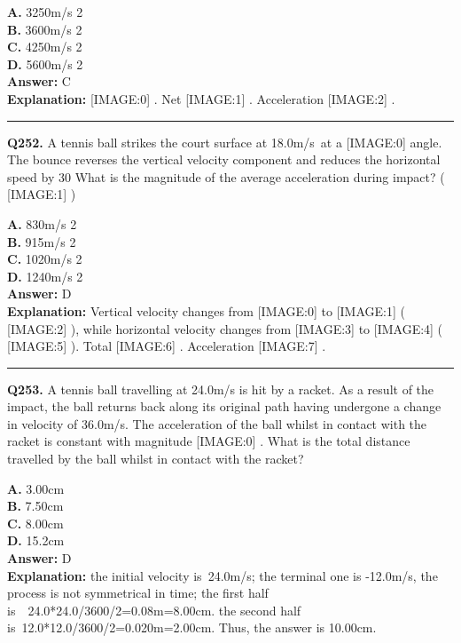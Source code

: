 \documentclass[12pt]{article}
\begin{document}
\textbf{A.} 3250m/s
2 \\
\textbf{B.} 3600m/s
2 \\
\textbf{C.} 4250m/s
2 \\
\textbf{D.} 5600m/s
2 \\

\textbf{Answer:} C \\
\textbf{Explanation:} [IMAGE:0]
. Net
[IMAGE:1]
. Acceleration
[IMAGE:2]
.

\hrule
\vspace{1em}


\noindent
\textbf{Q252.} A tennis ball strikes the court surface at 18.0m/s at a
[IMAGE:0]
angle. The bounce reverses the vertical velocity component and reduces the horizontal speed by 30%
What is the magnitude of the average acceleration during impact? (
[IMAGE:1]
)



\textbf{A.} 830m/s
2 \\
\textbf{B.} 915m/s
2 \\
\textbf{C.} 1020m/s
2 \\
\textbf{D.} 1240m/s
2 \\

\textbf{Answer:} D \\
\textbf{Explanation:} Vertical velocity changes from
[IMAGE:0]
to
[IMAGE:1]
(
[IMAGE:2]
), while horizontal velocity changes from
[IMAGE:3]
to
[IMAGE:4]
(
[IMAGE:5]
). Total
[IMAGE:6]
. Acceleration
[IMAGE:7]
.

\hrule
\vspace{1em}


\noindent
\textbf{Q253.} A tennis ball travelling at 24.0m/s is hit by a racket. As a result of the impact, the ball returns back along its original path having undergone a change in velocity of 36.0m/s. The acceleration of the ball whilst in contact with the racket is constant with magnitude
[IMAGE:0]
.
What is the total distance travelled by the ball whilst in contact with the racket?



\textbf{A.} 3.00cm \\
\textbf{B.} 7.50cm \\
\textbf{C.} 8.00cm \\
\textbf{D.} 15.2cm \\

\textbf{Answer:} D \\
\textbf{Explanation:} the initial velocity is 24.0m/s; the terminal one is -12.0m/s, the process is not symmetrical in time;
the first half is  24.0*24.0/3600/2=0.08m=8.00cm.
the second half is 12.0*12.0/3600/2=0.020m=2.00cm.
Thus, the answer is 10.00cm.
\end{document}

